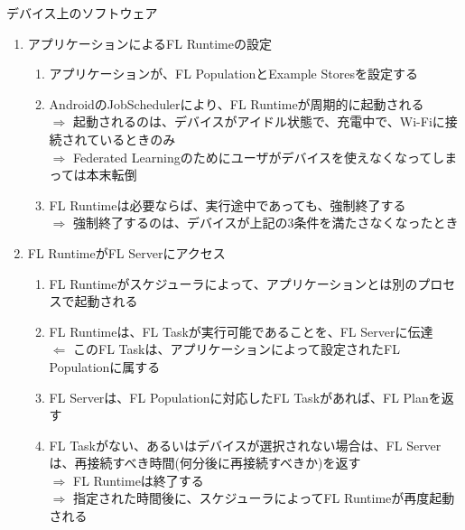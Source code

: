 \documentclass[dvipdfmx,notheorems,t]{beamer}
\begin{document}
\begin{frame}{デバイス上のソフトウェア}

\begin{enumerate}
	\item アプリケーションによるFL Runtimeの設定
	\begin{enumerate}
		\item アプリケーションが、FL PopulationとExample Storesを設定する
		\newline
		\item AndroidのJobSchedulerにより、FL Runtimeが周期的に起動される \\
		$\Rightarrow$ 起動されるのは、デバイスが\alert{アイドル状態}で、\alert{充電中}で、\alert{Wi-Fiに接続}されているときのみ \\
		$\Rightarrow$ Federated Learningのためにユーザがデバイスを使えなくなってしまっては本末転倒
		\newline
		\item FL Runtimeは必要ならば、実行途中であっても、強制終了する \\
		$\Rightarrow$ 強制終了するのは、デバイスが上記の3条件を満たさなくなったとき
	\end{enumerate}
	
	\framebreak
	
	\item FL RuntimeがFL Serverにアクセス
	\begin{enumerate}
		\item FL Runtimeがスケジューラによって、アプリケーションとは別のプロセスで起動される
		\newline
		\item FL Runtimeは、FL Taskが実行可能であることを、FL Serverに伝達 \\
		$\Leftarrow$ このFL Taskは、アプリケーションによって設定されたFL Populationに属する
		\newline
		\item FL Serverは、FL Populationに対応したFL Taskがあれば、FL Planを返す
		\newline
		\item FL Taskがない、あるいはデバイスが選択されない場合は、FL Serverは、再接続すべき時間(何分後に再接続すべきか)を返す \\
		$\Rightarrow$ FL Runtimeは終了する \\
		$\Rightarrow$ 指定された時間後に、スケジューラによってFL Runtimeが再度起動される
	\end{enumerate}
	
	\framebreak
	

\end{enumerate}
\end{frame}
\end{document}
